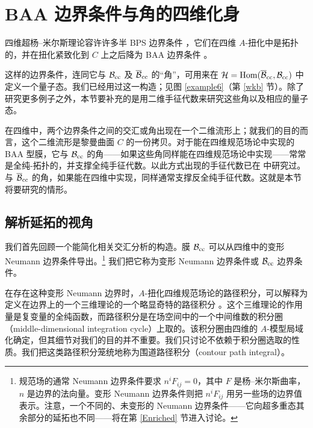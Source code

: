 
\section{BAA 边界条件与角的四维化身}\label{avatar}


四维超杨–米尔斯理论容许许多半 BPS 边界条件 \cite{Gaiotto:2008sa}，它们在四维 $A$-扭化中是拓扑的，并在扭化紧致化到 $C$ 上之后降为 BAA 边界条件 \cite{KW,Gaiotto:2016hvd,Gaiotto:2016wcv}。

这样的边界条件，连同它与 ${\mathcal B}_{\mathrm{cc}}$ 及 $\overline{{\mathcal B}}_{\mathrm{cc}}$ 的“角”，可用来在 ${\mathcal H}={\mathrm{Hom}}(\overline{{\mathcal B}}_{\mathrm{cc}},{\mathcal B}_{\mathrm{cc}})$ 中定义一个量子态。我们已经用过这一构造；见图 \ref{example6}（第 \ref{wkb} 节）。除了研究更多例子之外，本节要补充的是用二维手征代数来研究这些角以及相应的量子态。

在四维中，两个边界条件之间的交汇或角出现在一个二维流形上；就我们的目的而言，这个二维流形是黎曼曲面 $C$ 的一份拷贝。对于能在四维规范场论中实现的 BAA 型膜，它与 ${\mathcal B}_{\mathrm{cc}}$ 的角——如果这些角同样能在四维规范场论中实现——常常是全纯-拓扑的，并支撑全纯手征代数。以此方式出现的手征代数已在 \cite{Gaiotto:2016hvd,FG} 中研究过。与 $\overline{{\mathcal B}}_{\mathrm{cc}}$ 的角，如果能在四维中实现，同样通常支撑反全纯手征代数。这就是本节将要研究的情形。


\subsection{解析延拓的视角}\label{ACP}

我们首先回顾一个能简化相关交汇分析的构造。膜 ${\mathcal B}_{\mathrm{cc}}$ 可以从四维中的变形 Neumann 边界条件导出。\footnote{\label{deformed} 规范场的通常 Neumann 边界条件要求 $n^i F_{ij}=0$，其中 $F$ 是杨–米尔斯曲率，$n$ 是边界的法向量。变形 Neumann 边界条件则把 $n^i F_{ij}$ 用另一些场的边界值表示。注意，一个不同的、未变形的 Neumann 边界条件——它向超多重态其余部分的延拓也不同——将在第 \ref{Enriched} 节进入讨论。} 我们把它称为变形 Neumann 边界条件或 ${\mathcal B}_{\mathrm{cc}}$ 边界条件。

在存在这种变形 Neumann 边界时，$A$-扭化四维规范场论的路径积分，可以解释为定义在边界上的一个三维理论的一个略显奇特的路径积分 \cite{Witten:2010zr,Witten:2011zz}。这个三维理论的作用量是复变量的全纯函数，而路径积分是在场空间中的一个中间维数的积分圈（middle-dimensional integration cycle）上取的。该积分圈由四维的 $A$-模型局域化确定，但其细节对我们的目的并不重要。我们只讨论不依赖于积分圈选取的性质。我们把这类路径积分笼统地称为围道路径积分（contour path integral）。

